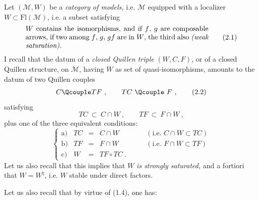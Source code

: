 Let $(\mathcal{M}, W)$ be a \textit{category of models,} i.e. $\mathcal{M}$ equipped with a localizer $W \subset \mathrm{Fl}(\mathcal{M})$, i.e. a subset satisfying
\[
\parbox{0.75\textwidth}{$W$ contains the isomorphisms, and if $f$, $g$ are composable arrows, if two among $f$, $g$, $gf$ are in $W$, the third also \textit{(weak saturation).}}
\tag*{(2.1)}
\]
I recall that the datum of a \textit{closed Quillen triple} $(W, C, F)$\textit{,} or of a closed Quillen structure, on $\mathcal{M}$, having $W$ as set of quasi-isomorphisms, amounts to the datum of two Quillen couples
\[
C \Qcouple TF\ , \qquad TC \ \Qcouple\ F\ , \tag*{(2.2)}
\]
satisfying
\[
TC \ \subset\ C \cap W\ , \qquad TF \ \subset\ F \cap W\ , \tag*{(2.3)}
\]
plus one of the three equivalent conditions:
\[
\left\{
\begin{array}{lrcll}
\text{a)} & TC & = & C \cap W & \qquad (\text{i.e. } C \cap W \subset TC) \\[1ex]
\text{b)} & TF & = & F \cap W & \qquad (\text{i.e. } F \cap W \subset TF) \\[1ex]
\text{c)} & W & = & TF \circ TC\ . &
\end{array}
\right.
\tag*{(2.4)}
\]
Let us also recall that this implies that $W$ \textit{is strongly saturated,} and a fortiori that $W = W^{\natural}$, i.e. $W$ stable under direct factors.

Let us also recall that by virtue of (1.4), one has: